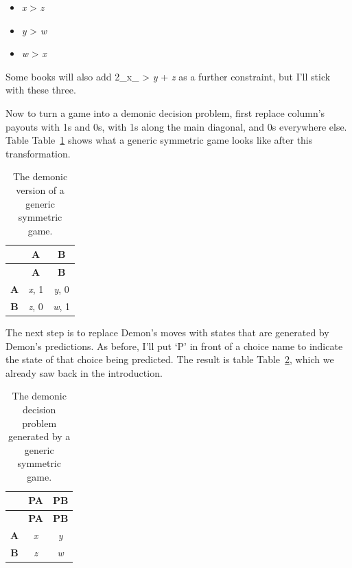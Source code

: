 \documentclass[
  12pt,
  letterpaper,
  DIV=11,
  numbers=noendperiod]{scrreprt}
\providecommand{\tightlist}{%
  \setlength{\itemsep}{0pt}\setlength{\parskip}{0pt}}\usepackage{longtable,booktabs,array}
\begin{document}
\begin{itemize}
\tightlist
\item
  \emph{x} \textgreater{} \emph{z}
\item
  \emph{y} \textgreater{} \emph{w}
\item
  \emph{w} \textgreater{} \emph{x}
\end{itemize}

Some books will also add 2\_x\_ \textgreater{} \emph{y} + \emph{z} as a
further constraint, but I'll stick with these three.

Now to turn a game into a demonic decision problem, first replace
column's payouts with 1s and 0s, with 1s along the main diagonal, and 0s
everywhere else. Table Table~\ref{tbl-demon-sym-game} shows what a
generic symmetric game looks like after this transformation.

\begin{longtable}[]{@{}ccc@{}}
\caption{The demonic version of a generic symmetric
game.}\label{tbl-demon-sym-game}\tabularnewline
\toprule\noalign{}
& \textbf{A} & \textbf{B} \\
\midrule\noalign{}
\endfirsthead
\toprule\noalign{}
& \textbf{A} & \textbf{B} \\
\midrule\noalign{}
\endhead
\bottomrule\noalign{}
\endlastfoot
\textbf{A} & \emph{x}, 1 & \emph{y}, 0 \\
\textbf{B} & \emph{z}, 0 & \emph{w}, 1 \\
\end{longtable}

The next step is to replace Demon's moves with states that are generated
by Demon's predictions. As before, I'll put `P' in front of a choice
name to indicate the state of that choice being predicted. The result is
table Table~\ref{tbl-gen-dem-problem}, which we already saw back in the
introduction.

\begin{longtable}[]{@{}ccc@{}}
\caption{The demonic decision problem generated by a generic symmetric
game.}\label{tbl-gen-dem-problem}\tabularnewline
\toprule\noalign{}
& \textbf{PA} & \textbf{PB} \\
\midrule\noalign{}
\endfirsthead
\toprule\noalign{}
& \textbf{PA} & \textbf{PB} \\
\midrule\noalign{}
\endhead
\bottomrule\noalign{}
\endlastfoot
\textbf{A} & \emph{x} & \emph{y} \\
\textbf{B} & \emph{z} & \emph{w} \\
\end{longtable}
\end{document}
